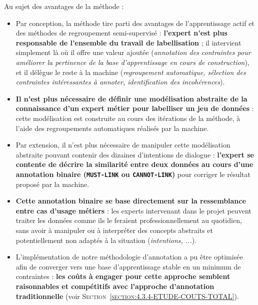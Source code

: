 		Au sujet des avantages de la méthode :
		\begin{itemize}
			\item[\textcolor{colorDarkPastelGreen}{\textcolor{colorDarkPastelGreen}{\faThumbsUp}}]
				Par conception, la méthode tire parti des avantages de l'apprentissage actif et des méthodes de regroupement semi-supervisé : \textbf{l'expert n'est plus responsable de l'ensemble du travail de labellisation} ; il intervient simplement là où il offre une valeur ajoutée (\textit{annotation des contraintes pour améliorer la pertinence de la base d'apprentissage en cours de construction}), et il délègue le reste à la machine (\textit{regroupement automatique, sélection des contraintes intéressantes à annoter, identification des incohérences}).
			\item[\textcolor{colorDarkPastelGreen}{\textcolor{colorDarkPastelGreen}{\faThumbsUp}}]
				\textbf{Il n'est plus nécessaire de définir une modélisation abstraite de la connaissance d'un expert métier pour labelliser un jeu de données} : cette modélisation est construite au cours des itérations de la méthode, à l'aide des regroupements automatiques réalisés par la machine.
			\item[\textcolor{colorDarkPastelGreen}{\textcolor{colorDarkPastelGreen}{\faThumbsUp}}]
				Par extension, il n'est plus nécessaire de manipuler cette modélisation abstraite pouvant contenir des dizaines d'intentions de dialogue :
				\textbf{l'expert se contente de décrire la similarité entre deux données au cours d'une annotation binaire (\texttt{MUST-LINK} ou \texttt{CANNOT-LINK})} pour corriger le résultat proposé par la machine.
			\item[\textcolor{colorDarkPastelGreen}{\textcolor{colorDarkPastelGreen}{\faThumbsUp}}]
				\textbf{Cette annotation binaire se base directement sur la ressemblance entre cas d'usage métiers} : les experts intervenant dans le projet peuvent traiter les données comme ils le feraient professionnellement au quotidien, sans avoir à manipuler ou à interpréter des concepts abstraits et potentiellement non adaptés à la situation (\textit{intentions, ...}).
			\item[\textcolor{colorDarkPastelGreen}{\textcolor{colorDarkPastelGreen}{\faThumbsUp}}]
				L'implémentation de notre méthodologie d'annotation a pu être optimisée afin de converger vers une base d'apprentissage stable en un minimum de contraintes : \textbf{les coûts à engager pour cette approche semblent raisonnables et compétitifs avec l'approche d'annotation traditionnelle} (voir \textsc{Section~\ref{section:4.3.4-ETUDE-COUTS-TOTAL}}).
		\end{itemize}
	
